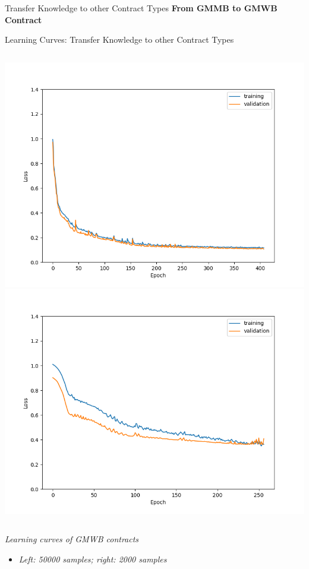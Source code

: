     \begin{frame}{Transfer Knowledge to other Contract Types}
    \textbf{From GMMB to GMWB Contract}
    \end{frame}
    
    \begin{frame}{Learning Curves: Transfer Knowledge to other Contract Types}
    \begin{columns}
    \includegraphics[height=0.8\textheight]{../project3/figures/figure4a.png}
    \includegraphics[height=0.8\textheight]{../project3/figures/figure4b.png}
    \end{columns}
    
    \textit{Learning curves of GMWB contracts}
    \begin{itemize}
        \item \textit{Left: 50000 samples; right: 2000 samples}
    \end{itemize}
    \end{frame}
    
